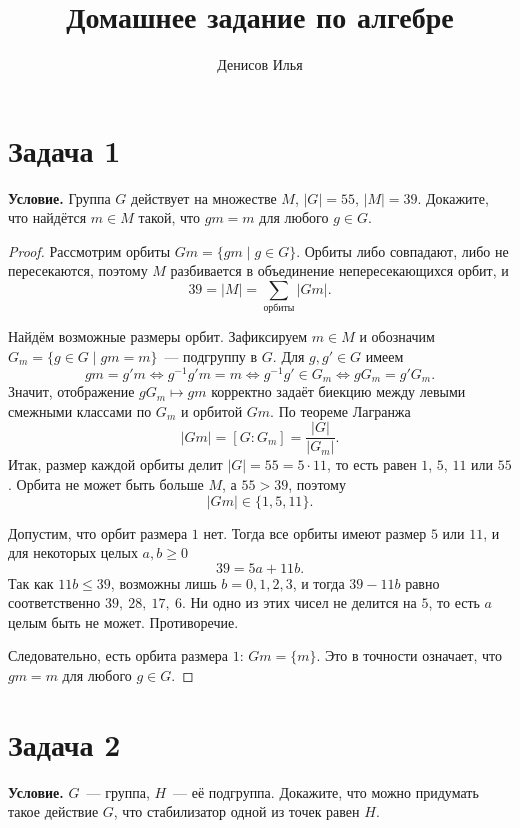 \documentclass[12pt]{article}
\title{Домашнее задание по алгебре}
\author{Денисов Илья}
\date{}
\begin{document}
	\maketitle

	\section*{Задача 1}

	\noindent
	\textbf{Условие.} Группа $G$ действует на множестве $M$, $|G|=55$,
	$|M|=39$. Докажите, что найдётся $m\in M$ такой, что $gm=m$ для любого
	$g\in G$.

	\begin{proof}
		Рассмотрим орбиты $Gm=\{gm\mid g\in G\}$. Орбиты либо совпадают,
		либо не пересекаются, поэтому $M$ разбивается в объединение
		непересекающихся орбит, и
		\[
			39=|M|=\sum_{\text{орбиты}}|Gm|.
		\]

		Найдём возможные размеры орбит. Зафиксируем $m\in M$ и обозначим
		$G_m=\{g\in G\mid gm=m\}$~--- подгруппу в $G$.
		Для $g,g'\in G$ имеем
		\[
			gm=g'm
			\iff g^{-1}g'm=m
			\iff g^{-1}g'\in G_m
			\iff gG_m=g'G_m.
		\]
		Значит, отображение $gG_m\mapsto gm$ корректно задаёт
		биекцию между левыми смежными классами по $G_m$ и
		орбитой $Gm$. По теореме Лагранжа
		\[
			|Gm|=[G:G_m]=\frac{|G|}{|G_m|}.
		\]
		Итак, размер каждой орбиты делит $|G|=55=5\cdot11$, то есть равен
		$1$, $5$, $11$ или $55$. Орбита не может быть больше $M$, а
		$55>39$, поэтому
		\[
			|Gm|\in\{1,5,11\}.
		\]

		Допустим, что орбит размера $1$ нет. Тогда все орбиты имеют размер $5$
		или $11$, и для некоторых целых $a,b\geqslant0$
		\[
			39=5a+11b.
		\]
		Так как $11b\leqslant39$, возможны лишь $b=0,1,2,3$, и тогда
		$39-11b$ равно соответственно $39,\ 28,\ 17,\ 6$. Ни одно из этих
		чисел не делится на $5$, то есть $a$ целым быть не может. Противоречие.

		Следовательно, есть орбита размера $1$: $Gm=\{m\}$. Это в точности
		означает, что $gm=m$ для любого $g\in G$.
	\end{proof}

	\section*{Задача 2}

	\noindent
	\textbf{Условие.} $G$~--- группа, $H$~--- её подгруппа. Докажите, что
	можно придумать такое действие $G$, что стабилизатор одной из точек
	равен $H$.
\end{document}
